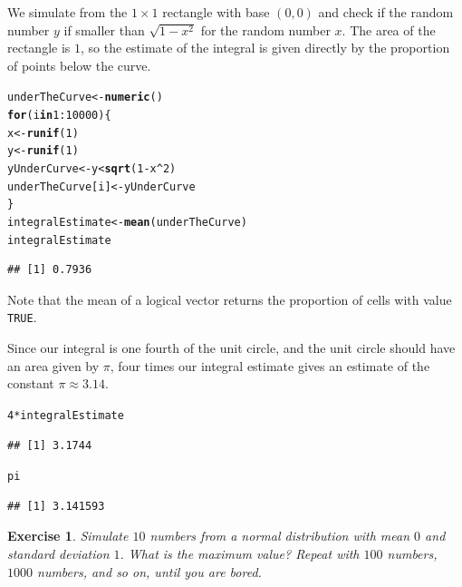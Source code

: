 \documentclass{article}\usepackage[]{graphicx}\usepackage[]{color}
\makeatletter
\newcommand{\hlnum}[1]{\textcolor[rgb]{0.686,0.059,0.569}{#1}}%
\newcommand{\hlopt}[1]{\textcolor[rgb]{0,0,0}{#1}}%
\newcommand{\hlstd}[1]{\textcolor[rgb]{0.345,0.345,0.345}{#1}}%
\newcommand{\hlkwa}[1]{\textcolor[rgb]{0.161,0.373,0.58}{\textbf{#1}}}%
\newcommand{\hlkwb}[1]{\textcolor[rgb]{0.69,0.353,0.396}{#1}}%
\newcommand{\hlkwd}[1]{\textcolor[rgb]{0.737,0.353,0.396}{\textbf{#1}}}%
\newenvironment{kframe}{%
 \def\at@end@of@kframe{}%
 \ifinner\ifhmode%
  \def\at@end@of@kframe{\end{minipage}}%
  \begin{minipage}{\columnwidth}%
 \fi\fi%
 \def\FrameCommand##1{\hskip\@totalleftmargin \hskip-\fboxsep
 \colorbox{shadecolor}{##1}\hskip-\fboxsep
     \hskip-\linewidth \hskip-\@totalleftmargin \hskip\columnwidth}%
 \MakeFramed {\advance\hsize-\width
   \@totalleftmargin\z@ \linewidth\hsize
   \@setminipage}}%
 {\par\unskip\endMakeFramed%
 \at@end@of@kframe}
\newenvironment{knitrout}{}{} %
\newtheorem{exercise}{Exercise}[section]
\makeatother
\begin{document}
We simulate from the $1 \times 1$ rectangle with base $(0,0)$ and check if the random number $y$ if smaller than $\sqrt{1-x^2}$ for the random number $x$. The area of the rectangle is $1$, so the estimate of the integral is given directly by the proportion of points below the curve.
\begin{knitrout}
\color{fgcolor}\begin{kframe}
\begin{alltt}
\hlstd{underTheCurve} \hlkwb{<-} \hlkwd{numeric}\hlstd{()}
\hlkwa{for}\hlstd{(i} \hlkwa{in} \hlnum{1}\hlopt{:}\hlnum{10000}\hlstd{)\{}
  \hlstd{x} \hlkwb{<-} \hlkwd{runif}\hlstd{(}\hlnum{1}\hlstd{)}
  \hlstd{y} \hlkwb{<-} \hlkwd{runif}\hlstd{(}\hlnum{1}\hlstd{)}
  \hlstd{yUnderCurve} \hlkwb{<-} \hlstd{y} \hlopt{<} \hlkwd{sqrt}\hlstd{(}\hlnum{1} \hlopt{-} \hlstd{x}\hlopt{^}\hlnum{2}\hlstd{)}
  \hlstd{underTheCurve[i]} \hlkwb{<-} \hlstd{yUnderCurve}
\hlstd{\}}
\hlstd{integralEstimate} \hlkwb{<-} \hlkwd{mean}\hlstd{(underTheCurve)}
\hlstd{integralEstimate}
\end{alltt}
\begin{verbatim}
## [1] 0.7936
\end{verbatim}
\end{kframe}
\end{knitrout}
Note that the mean of a logical vector returns the proportion of cells with value \texttt{TRUE}.

Since our integral is one fourth of the unit circle, and the unit circle should have an area given by $\pi$, four times our integral estimate gives an estimate of the constant $\pi \approx 3.14$.
\begin{knitrout}
\color{fgcolor}\begin{kframe}
\begin{alltt}
\hlnum{4} \hlopt{*} \hlstd{integralEstimate}
\end{alltt}
\begin{verbatim}
## [1] 3.1744
\end{verbatim}
\begin{alltt}
\hlstd{pi}
\end{alltt}
\begin{verbatim}
## [1] 3.141593
\end{verbatim}
\end{kframe}
\end{knitrout}

\begin{exercise}
Simulate $10$ numbers from a normal distribution with mean $0$ and standard deviation $1$. What is the maximum value? Repeat with $100$ numbers, $1000$ numbers, and so on, until you are bored.
\end{exercise}
\end{document}
